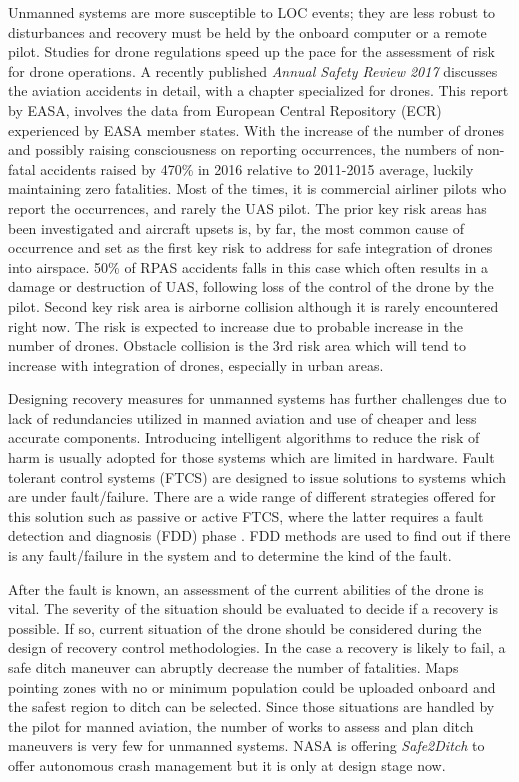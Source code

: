 Unmanned systems are more susceptible to LOC events; they are less robust to disturbances and recovery must be held by the onboard computer or a remote pilot\cite{richards2016vehicle}.
Studies for drone regulations speed up the pace for the assessment of risk for drone operations. A recently published \emph{Annual Safety Review 2017} \cite{annualSafetyReview} discusses the aviation accidents in detail, with a chapter specialized for drones. 
This report by EASA, involves the data from European Central Repository (ECR) experienced by EASA member states.
With the increase of the number of drones and possibly raising consciousness on reporting occurrences, the numbers of non-fatal accidents raised by 470\% in 2016 relative to 2011-2015 average, luckily maintaining zero fatalities. 
Most of the times, it is commercial airliner pilots who report the occurrences, and rarely the UAS pilot.
The prior key risk areas has been investigated and aircraft upsets is, by far, the most common cause of occurrence and set as the first key risk to address for safe integration of drones into airspace. 
50\% of RPAS accidents falls in this case which often results in a damage or destruction of UAS, following loss of the control of the drone by the pilot.
Second key risk area is airborne collision although it is rarely encountered right now. The risk is expected to increase due to probable increase in the number of drones. 
Obstacle collision is the 3rd risk area which will tend to increase with integration of drones, especially in urban areas.

Designing recovery measures for unmanned systems has further challenges due to lack of redundancies utilized in manned aviation and use of cheaper and less accurate components.
Introducing intelligent algorithms to reduce the risk of harm is usually adopted for those systems which are limited in hardware. 
Fault tolerant control systems (FTCS) are designed to issue solutions to systems which are under fault/failure. 
There are a wide range of different strategies offered for this solution such as passive or active FTCS, where the latter requires a fault detection and diagnosis (FDD) phase \cite{ducard2009fault}. 
FDD methods are used to find out if there is any fault/failure in the system and to determine the kind of the fault. 

After the fault is known, an assessment of the current abilities of the drone is vital. 
The severity of the situation should be evaluated to decide if a recovery is possible. 
If so, current situation of the drone should be considered during the design of recovery control methodologies.
In the case a recovery is likely to fail, a safe ditch maneuver can abruptly decrease the number of fatalities. 
Maps pointing zones with no or minimum population could be uploaded onboard and the safest region to ditch can be selected. 
Since those situations are handled by the pilot for manned aviation, the number of works to assess and plan ditch maneuvers is very few for unmanned systems. 
NASA is offering \emph{Safe2Ditch} \cite{nasa:safe2ditch} to offer autonomous crash management but it is only at design stage now. 


